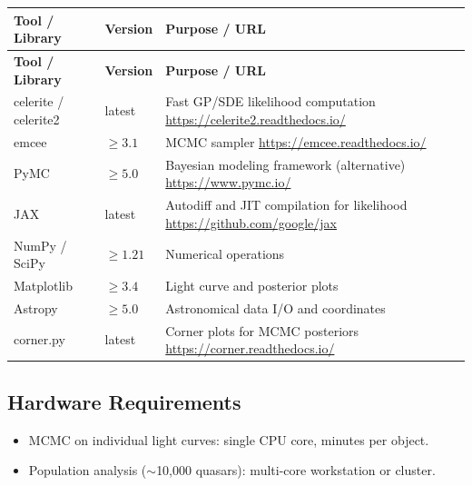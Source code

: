 \documentclass[11pt,a4paper]{article}
\begin{document}
\begin{longtable}{p{4.5cm} p{2.5cm} p{6.5cm}}
\toprule
\textbf{Tool / Library} & \textbf{Version} & \textbf{Purpose / URL} \\
\midrule
\endfirsthead
\toprule
\textbf{Tool / Library} & \textbf{Version} & \textbf{Purpose / URL} \\
\midrule
\endhead
celerite / celerite2 & latest & Fast GP/SDE likelihood computation \newline \url{https://celerite2.readthedocs.io/} \\
\midrule
emcee & $\geq 3.1$ & MCMC sampler \newline \url{https://emcee.readthedocs.io/} \\
\midrule
PyMC & $\geq 5.0$ & Bayesian modeling framework (alternative) \newline \url{https://www.pymc.io/} \\
\midrule
JAX & latest & Autodiff and JIT compilation for likelihood \newline \url{https://github.com/google/jax} \\
\midrule
NumPy / SciPy & $\geq 1.21$ & Numerical operations \\
\midrule
Matplotlib & $\geq 3.4$ & Light curve and posterior plots \\
\midrule
Astropy & $\geq 5.0$ & Astronomical data I/O and coordinates \\
\midrule
corner.py & latest & Corner plots for MCMC posteriors \newline \url{https://corner.readthedocs.io/} \\
\bottomrule
\end{longtable}

\subsection{Hardware Requirements}
\begin{itemize}
  \item MCMC on individual light curves: single CPU core, minutes per object.
  \item Population analysis ($\sim$10,000 quasars): multi-core workstation or cluster.
\end{itemize}
\end{document}
